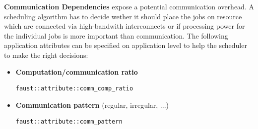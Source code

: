 \textbf{Communication Dependencies} expose a potential communication overhead. A scheduling algorithm has to decide wether it should place the jobs on resource which are connected via high-bandwith interconnects or if processing power for the individual jobs is more important than communication. The following application attributes can be specified on application level to help the scheduler to make the right decisions:

\begin{itemize}
\item \textbf{Computation/communication ratio}
\begin{verbatim}faust::attribute::comm_comp_ratio\end{verbatim}
\item \textbf{Communication pattern} (regular, irregular, ...) 
\begin{verbatim}faust::attribute::comm_pattern\end{verbatim}
\end{itemize}

